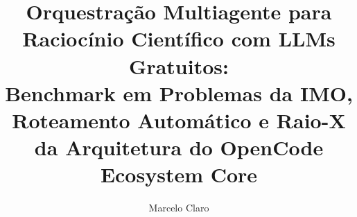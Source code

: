 \documentclass[12pt,openright,oneside,a4paper,chapter=TITLE,section=TITLE]{abntex2}
\title{Orquestração Multiagente para Raciocínio Científico com LLMs Gratuitos:\\ Benchmark em Problemas da IMO, Roteamento Automático e Raio-X da Arquitetura do OpenCode Ecosystem Core}
\author{Marcelo Claro}
\begin{document}



\tableofcontents*
\clearpage

\textual







\postextual

\end{document}

